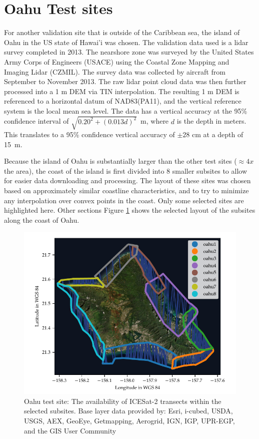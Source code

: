 \section{Oahu Test sites}\label{sec:oahuresults}

For another validation site that is outside of the Caribbean sea, the island of Oahu in the US state of Hawai'i was chosen. The validation data used is a lidar survey completed in 2013. The nearshore zone was surveyed by the United States Army Corps of Engineers (USACE) using the Coastal Zone Mapping and Imaging Lidar (CZMIL). The survey data was collected by aircraft from September to November 2013. The raw lidar point cloud data was then further processed into a 1 m DEM via TIN interpolation. The resulting 1 m DEM is referenced to a horizontal datum of NAD83(PA11), and the vertical reference system is the local mean sea level. The data has a vertical accuracy at the 95\% confidence interval of $\sqrt{0.20^2 + (0.013d)^2}$~m, where $d$ is the depth in meters. This translates to a 95\% confidence vertical accuracy of $\pm 28$ cm at a depth of 15~m.

Because the island of Oahu is substantially larger than the other test sites ($\approx 4x$ the area), the coast of the island is first divided into 8 smaller subsites to allow for easier data downloading and processing. The layout of these sites was chosen based on approximately similar coastline characteristics, and to try to minimize any interpolation over convex points in the coast. Only some selected sites are highlighted here. Other sections  Figure \ref{fig:oahu-subsite-layout} shows the selected layout of the subsites along the coast of Oahu.

\begin{figure}[htbp]
    \centering
    \includegraphics{figures/Oahu_all_tracklines.pdf}
    \caption[Oahu test site: Transects and subsite layout]{Oahu test site: The availability of ICESat-2 transects within the selected subsites. Base layer data provided by: Esri, i-cubed, USDA, USGS, AEX, GeoEye, Getmapping, Aerogrid, IGN, IGP, UPR-EGP, and the GIS User Community}
    \label{fig:oahu-subsite-layout}
\end{figure}

